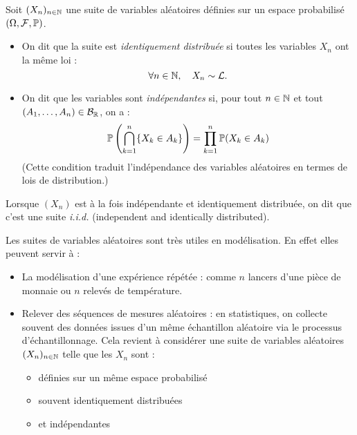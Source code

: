 \begin{definition}[Suite i.i.d.]
    Soit $(X_n)_{n \in \mathbb{N}}$ une suite de variables aléatoires définies sur un espace probabilisé 
    $(\Omega, \mathcal{F}, \mathbb{P})$. 
    
    \begin{itemize}
        \item On dit que la suite est \emph{identiquement distribuée} si toutes les variables $X_n$ ont la même loi :
        \[ \forall n \in \mathbb{N}, \quad X_n \sim \mathcal{L}. \]
        
        \item On dit que les variables sont \emph{indépendantes} si, pour tout $n \in \mathbb{N}$ et tout $(A_1, \dots, A_n) \in \mathcal{B}_{\mathbb{R}}$, on a :
        \[ \mathbb{P}\left( \bigcap_{k = 1}^{n} \{ X_k \in A_k \} \right) = \prod_{k = 1}^{n} \mathbb{P}(X_k \in A_k) \]
        (Cette condition traduit l'indépendance des variables aléatoires en termes de lois de distribution.)
    \end{itemize}
    
    \medskip
    
    Lorsque $(X_n)$ est à la fois indépendante et identiquement distribuée, on dit que c’est une suite \emph{i.i.d.} (independent and identically distributed).
\end{definition}

Les suites de variables aléatoires sont très utiles en modélisation. En effet elles peuvent servir à : 
\begin{itemize}
    \item La modélisation d'une expérience répétée : comme $n$ lancers d'une pièce de monnaie ou $n$ relevés de température. 
    \item Relever des séquences de mesures aléatoires : en statistiques, on collecte souvent des données issues d'un même échantillon 
    aléatoire via le processus d'échantillonnage. Cela revient à considérer une suite de variables aléatoires 
    $(X_n)_{n \in \mathbb{N}}$ telle que les $X_n$ sont : 
        \begin{itemize}
            \item définies sur un même espace probabilisé 
            \item souvent identiquement distribuées 
            \item et indépendantes
        \end{itemize}
\end{itemize}

